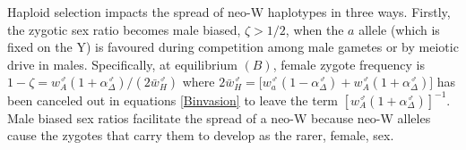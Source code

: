 \documentclass[12pt]{article}
\begin{document}

Haploid selection impacts the spread of neo-W haplotypes in three ways.
Firstly, the zygotic sex ratio becomes male biased, $\zeta>1/2$, when the $a$ allele (which is fixed on the Y) is favoured during competition among male gametes or by meiotic drive in males.
Specifically, at equilibrium $(B)$, female zygote frequency is $1 - \zeta = w_A^\male (1+\alpha^\male_\Delta) / (2\bar{w}_{H}^\male)$ where $2\bar{w}_{H}^\male= \big[w_a^\male (1-\alpha^\male_\Delta) +  w_A^\male (1+\alpha^\male_\Delta) \big]$ has been canceled out in equations \eqref{Binvasion} to leave the term $\left[w_{A}^\male (1+\alpha^\male_\Delta) \right]^{-1}$. 
Male biased sex ratios facilitate the spread of a neo-W because neo-W alleles cause the zygotes that carry them to develop as the rarer, female, sex. 
\end{document}
